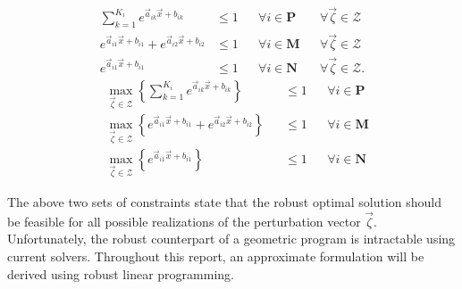 \begin{multicols}{2}
\begin{equation}
\begin{aligned}
\textstyle{\sum}_{k=1}^{K_i}e^{\vec{a}_{ik}\vec{x} + b_{ik}} &\leq 1 &&\forall i \in \mathbf{P} && \forall \vec{\zeta} \in \mathcal{Z}\\
e^{\vec{a}_{i1}\vec{x} + b_{i1}} + e^{\vec{a}_{i2}\vec{x} + b_{i2}} &\leq 1 &&\forall i \in \mathbf{M} && \forall \vec{\zeta} \in \mathcal{Z}\\
e^{\vec{a}_{i1}\vec{x} + b_{i1}} &\leq 1 &&\forall i \in \mathbf{N} && \forall \vec{\zeta} \in \mathcal{Z}.
\end{aligned}
\label{GP_counterparts}
\end{equation}\break
\begin{equation}
\begin{aligned}
&\max_{\vec{\zeta} \in \mathcal{Z}} \left\{\textstyle{\sum}_{k=1}^{K_i}e^{\vec{a}_{ik}\vec{x} + b_{ik}}\right\} &&\leq 1 &&\forall i \in \mathbf{P}\\
&\max_{\vec{\zeta} \in \mathcal{Z}} \left\{e^{\vec{a}_{i1}\vec{x} + b_{i1}} + e^{\vec{a}_{i2}\vec{x} + b_{i2}}\right\} &&\leq 1 &&\forall i \in \mathbf{M}\\
&\max_{\vec{\zeta} \in \mathcal{Z}} \left\{e^{\vec{a}_{i1}\vec{x} + b_{i1}}\right\} &&\leq 1 &&\forall i \in \mathbf{N}
\end{aligned}
\label{GP_counterparts_finite}
\end{equation}
\end{multicols}

The above two sets of constraints state that the robust optimal solution should be feasible for all possible realizations of the perturbation vector $\vec{\zeta}$. Unfortunately, the robust counterpart of a geometric program is intractable using current solvers. Throughout this report, an approximate formulation will be derived using robust linear programming.\\ [12pt]

